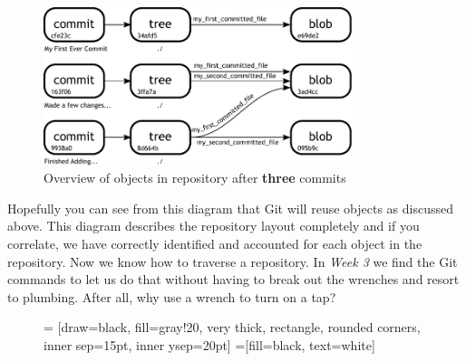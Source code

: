 \begin{figure}[hbt]
\centering
\includegraphics[width=9cm]{images/f-af2-d3.pdf}
\caption{Overview of objects in repository after \textbf{three} commits}
\end{figure}

Hopefully you can see from this diagram that Git will reuse objects as discussed above.  This diagram describes the repository layout completely and if you correlate, we have correctly identified and accounted for each object in the repository.  Now we know how to traverse a repository.  In \emph{Week 3} we find the Git commands to let us do that without having to break out the wrenches and resort to plumbing.  After all, why use a wrench to turn on a tap?

\begin{figure}[hbt]
 = [draw=black, fill=gray!20, very thick, rectangle, rounded corners, inner sep=15pt, inner ysep=20pt]
 =[fill=black, text=white]
\end{figure}
